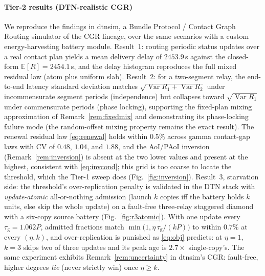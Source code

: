 \documentclass[twocolumn,3p,times,procedia]{elsarticle}
\theoremstyle{plain}
\theoremstyle{remark}
\newcommand{\E}{\mathbb{E}}
\newcommand{\GEN}{\tau_{\mathrm{g}}}
\begin{document}
\paragraph*{Tier-2 results (DTN-realistic CGR)}
We reproduce the findings in dtnsim, a Bundle Protocol / Contact Graph
Routing simulator of the CGR lineage, over the same scenarios with a
custom energy-harvesting battery module. Result~1: routing periodic
status updates over a real contact plan yields a mean delivery delay of
$2453.9$\,s against the closed-form $\E[R]{=}2454.1$\,s, and the
delay histogram reproduces the full mixed residual law (atom plus uniform
slab). Result~2: for a two-segment relay, the end-to-end latency standard
deviation matches $\sqrt{\operatorname{Var}R_1+\operatorname{Var}R_2}$
under incommensurate segment periods (independence) but collapses toward
$\sqrt{\operatorname{Var}R_1}$ under commensurate periods (phase locking),
supporting the fixed-plan mixing approximation of
Remark~\ref{rem:fixedmix} and demonstrating its phase-locking failure
mode (the random-offset mixing property remains the exact
result). The renewal residual
law \eqref{eq:renewal} holds within $0.5\%$ across gamma contact-gap
laws with $\mathrm{CV}$ of $0.48$, $1.04$, and $1.88$, and the AoI/PAoI
inversion (Remark~\ref{rem:inversion}) is absent at the two lower values
and present at the highest, consistent with \eqref{eq:invcond}; this
grid is too coarse to locate the threshold, which the Tier-1 sweep does
(Fig.~\ref{fig:inversion}). Result~3, starvation side: the threshold's
over-replication penalty is validated in the DTN stack with
\emph{update-atomic} all-or-nothing admission (launch $k$ copies iff
the battery holds $k$ units, else skip the whole update) on a
fault-free three-relay staggered diamond with a six-copy source battery
(Fig.~\ref{fig:r3atomic}).
With one update every $\GEN{=}1.062P$, admitted fractions match
$\min\bigl(1,\eta\,\GEN/(kP)\bigr)$ to within $0.7\%$ at every
$(\eta,k)$, and over-replication is punished as \eqref{eq:obj}
predicts: at $\eta{=}1$, $k{=}3$ skips two of three updates and its
peak age is $2.7\times$ single-copy's. The same experiment exhibits
Remark~\ref{rem:uncertainty} in dtnsim's CGR: fault-free, higher
degrees \emph{tie} (never strictly win) once $\eta\ge k$.


\end{document}
